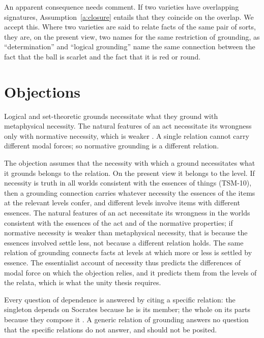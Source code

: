 \documentclass{situationist-preprint}
\begin{document}
An apparent consequence needs comment. If two varieties have overlapping signatures, Assumption~\ref{a:closure} entails that they coincide on the overlap. We accept this. Where two varieties are said to relate facts of the same pair of sorts, they are, on the present view, two names for the same restriction of grounding, as \enquote{determination} and \enquote{logical grounding} name the same connection between the fact that the ball is scarlet and the fact that it is red or round.

\section{Objections}\label{s:objections}

\begin{objection}\label{o:modal}
Logical and set-theoretic grounds necessitate what they ground with metaphysical necessity. The natural features of an act necessitate its wrongness only with normative necessity, which is weaker \citep{Fine2002}. A single relation cannot carry different modal forces; so normative grounding is a different relation.
\end{objection}

\begin{reply}
The objection assumes that the necessity with which a ground necessitates what it grounds belongs to the relation. On the present view it belongs to the level. If necessity is truth in all worlds consistent with the essences of things (TSM-10), then a grounding connection carries whatever necessity the essences of the items at the relevant levels confer, and different levels involve items with different essences. The natural features of an act necessitate its wrongness in the worlds consistent with the essences of the act and of the normative properties; if normative necessity is weaker than metaphysical necessity, that is because the essences involved settle less, not because a different relation holds. The same relation of grounding connects facts at levels at which more or less is settled by essence. The essentialist account of necessity thus predicts the differences of modal force on which the objection relies, and it predicts them from the levels of the relata, which is what the unity thesis requires.
\end{reply}

\begin{objection}\label{o:work}
Every question of dependence is answered by citing a specific relation: the singleton depends on Socrates because he is its member; the whole on its parts because they compose it \citep{Wilson2014}. A generic relation of grounding answers no question that the specific relations do not answer, and should not be posited.
\end{objection}
\end{document}
